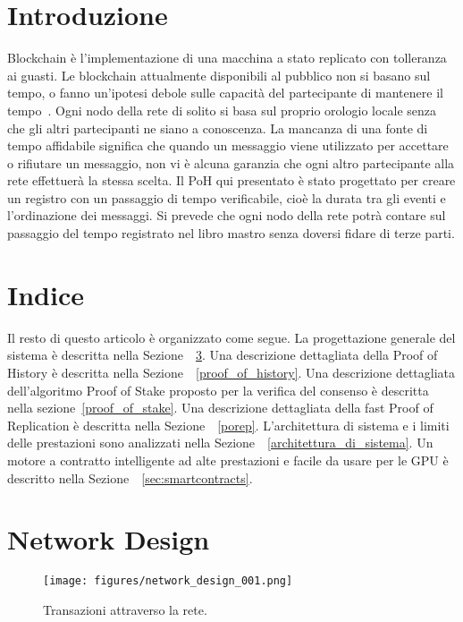 \documentclass[12pt]{article}
\begin{document}
\section{Introduzione}\normalsize
Blockchain è l'implementazione di una macchina a stato replicato con tolleranza ai guasti. Le blockchain attualmente disponibili al pubblico non si basano sul tempo, o fanno un'ipotesi debole sulle capacità del partecipante di mantenere il tempo~\cite{tendermint,hashgraph}. Ogni nodo della rete di solito si basa sul proprio orologio locale senza che gli altri partecipanti ne siano a conoscenza. La mancanza di una fonte di tempo affidabile significa che quando un messaggio viene utilizzato per accettare o rifiutare un messaggio, non vi è alcuna garanzia che ogni altro partecipante alla rete effettuerà la stessa scelta. Il PoH qui presentato è stato progettato per creare un registro con un passaggio di tempo verificabile, cioè la durata tra gli eventi e l'ordinazione dei messaggi. Si prevede che ogni nodo della rete potrà contare sul passaggio del tempo registrato nel libro mastro senza doversi fidare di terze parti.

\section{Indice}
Il resto di questo articolo è organizzato come segue. La progettazione generale del sistema è descritta nella Sezione ~\ref{design}. Una descrizione dettagliata della Proof of History è descritta nella Sezione ~\ref{proof_of_history}. Una descrizione dettagliata dell'algoritmo Proof of Stake proposto per la verifica del consenso  è descritta nella sezione~\ref{proof_of_stake}. Una descrizione dettagliata della fast Proof of Replication  è descritta nella Sezione ~\ref{porep}. L'architettura di sistema e i limiti delle prestazioni sono analizzati nella Sezione ~\ref{architettura_di_sistema}. Un motore a contratto intelligente ad alte prestazioni e facile da usare per le GPU è descritto nella Sezione ~\ref{sec:smartcontracts}.

\section{Network Design}\label{design}

\begin{figure}[h]
  \begin{center}
    \centering
    \texttt{[image: figures/network\_design\_001.png]}
    \caption[Fig 1]{Transazioni attraverso la rete.\label{fig:design}}
  \end{center}
  \end{figure}
\end{document}
